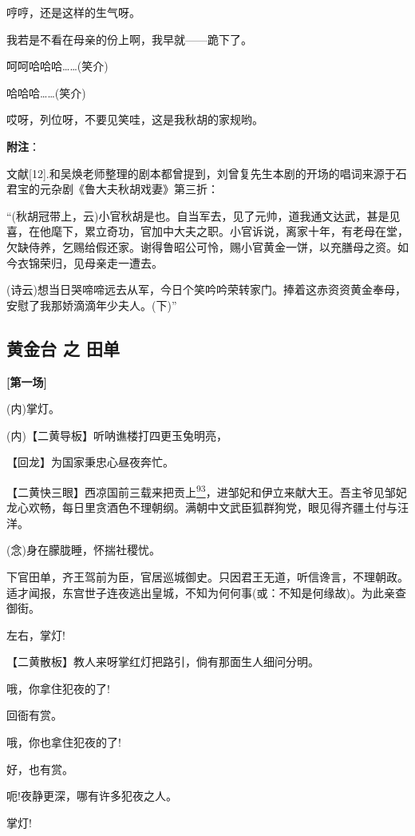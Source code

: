 哼哼，还是这样的生气呀。

我若是不看在母亲的份上啊，我早就------跪下了。

呵呵哈哈哈\ldots{}\ldots{}(笑介)

哈哈哈\ldots{}\ldots{}(笑介)

哎呀，列位呀，不要见笑哇，这是我秋胡的家规哟。

\textbf{附注}：

文献{[}12{]}.和吴焕老师整理的剧本都曾提到，刘曾复先生本剧的开场的唱词来源于石君宝的元杂剧《鲁大夫秋胡戏妻》第三折：

``(秋胡冠带上，云)小官秋胡是也。自当军去，见了元帅，道我通文达武，甚是见喜，在他麾下，累立奇功，官加中大夫之职。小官诉说，离家十年，有老母在堂，欠缺侍养，乞赐给假还家。谢得鲁昭公可怜，赐小官黄金一饼，以充膳母之资。如今衣锦荣归，见母亲走一遭去。

(诗云)想当日哭啼啼远去从军，今日个笑吟吟荣转家门。捧着这赤资资黄金奉母，安慰了我那娇滴滴年少夫人。(下)''

\hypertarget{ux9ec4ux91d1ux53f0-ux4e4b-ux7530ux5355}{%
\subsection{黄金台 之
田单}\label{ux9ec4ux91d1ux53f0-ux4e4b-ux7530ux5355}}

\textbf{{[}第一场{]}}

(内)掌灯。

(内)【二黄导板】听呐谯楼打四更玉兔明亮，

【回龙】为国家秉忠心昼夜奔忙。

【二黄快三眼】西凉国前三载来把贡上\protect\hyperlink{fn93}{\textsuperscript{93}}，进邹妃和伊立来献大王。吾主爷见邹妃龙心欢畅，每日里贪酒色不理朝纲。满朝中文武臣狐群狗党，眼见得齐疆土付与汪洋。

(念)身在朦胧睡，怀揣社稷忧。

下官田单，齐王驾前为臣，官居巡城御史。只因君王无道，听信谗言，不理朝政。适才闻报，东宫世子连夜逃出皇城，不知为何何事(或：不知是何缘故)。为此亲查御街。

左右，掌灯!

【二黄散板】教人来呀掌红灯把路引，倘有那面生人细问分明。

哦，你拿住犯夜的了!

回衙有赏。

哦，你也拿住犯夜的了!

好，也有赏。

呃!夜静更深，哪有许多犯夜之人。

掌灯!

